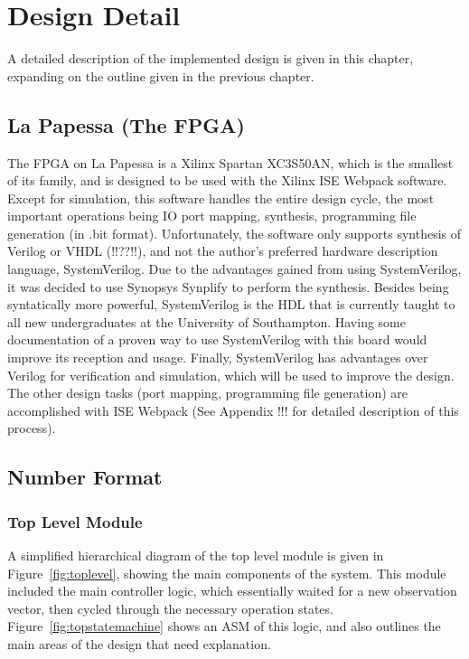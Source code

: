 \chapter{Design Detail} %
\label{cha:system_design}

A detailed description of the implemented design is given in this chapter, expanding on the outline given in the previous chapter.

\section{La Papessa (The FPGA)} %
\label{sec:la_papessa_fpga}

	The FPGA on La Papessa is a Xilinx Spartan XC3S50AN, which is the smallest of its family, and is designed to be used with the Xilinx ISE Webpack software.  Except for simulation, this software handles the entire design cycle, the most important operations being IO port mapping, synthesis, programming file generation (in .bit format).  Unfortunately, the software only supports synthesis of Verilog or VHDL (!!??!!), and not the author's preferred hardware description language, SystemVerilog.  Due to the advantages gained from using SystemVerilog, it was decided to use Synopsys Synplify to perform the synthesis.  Besides being syntatically more powerful, SystemVerilog is the HDL that is currently taught to all new undergraduates at the University of Southampton.  Having some documentation of a proven way to use SystemVerilog with this board would improve its reception and usage.  Finally, SystemVerilog has advantages over Verilog for verification and simulation, which will be used to improve the design.  The other design tasks (port mapping, programming file generation) are accomplished with ISE Webpack (See Appendix !!! for detailed description of this process).

	\section{Number Format} %
	\label{sec:number_format}

	\subsection{Top Level Module} %
	\label{sub:top_level_module}
		A simplified hierarchical diagram of the top level module is given in Figure~\ref{fig:toplevel}, showing the main components of the system.  This module included the main controller logic, which essentially waited for a new observation vector, then cycled through the necessary operation states.  Figure~\ref{fig:topstatemachine} shows an ASM of this logic, and also outlines the main areas of the design that need explanation.

